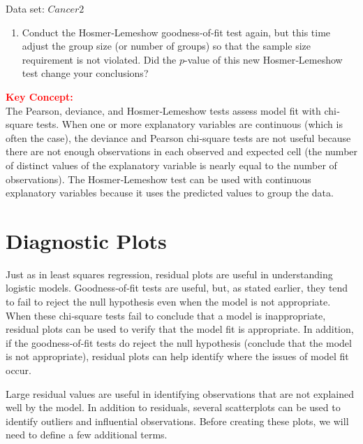 \documentclass[
]{report}
\providecommand{\tightlist}{%
  \setlength{\itemsep}{0pt}\setlength{\parskip}{0pt}}
\begin{document}
Data set: \(Cancer2\)

\begin{enumerate}
\def\labelenumi{\arabic{enumi}.}
\setcounter{enumi}{31}
\tightlist
\item
  Conduct the Hosmer‐Lemeshow goodness‐of‐fit test again, but this time adjust the group size (or number of groups) so that the sample size requirement is not violated. Did the \(p\)-value of this new Hosmer‐Lemeshow test change your conclusions?
\end{enumerate}

\large

\textbf{\textcolor{red}{Key Concept:}}\\
\color{red}
The Pearson, deviance, and Hosmer‐Lemeshow tests assess model fit with chi‐square tests. When one or more explanatory variables are continuous (which is often the case), the deviance and Pearson chi‐square tests are not useful because there are not enough observations in each observed and expected cell (the number of distinct values of the explanatory variable is nearly equal to the number of observations). The Hosmer‐Lemeshow test can be used with continuous explanatory variables because it uses the predicted values to group the data.
\color{black}
\normalsize

\hypertarget{diagnostic-plots-1}{%
\section{\texorpdfstring{\textbf{Diagnostic Plots}}{Diagnostic Plots}}\label{diagnostic-plots-1}}

Just as in least squares regression, residual plots are useful in understanding logistic models. Goodness‐of‐fit tests are useful, but, as stated earlier, they tend to fail to reject the null hypothesis even when the model is not appropriate. When these chi‐square tests fail to conclude that a model is inappropriate, residual plots can be used to verify that the model fit is appropriate. In addition, if the goodness‐of‐fit tests do reject the null hypothesis (conclude that the model is not appropriate), residual plots can help identify where the issues of model fit occur.

Large residual values are useful in identifying observations that are not explained well by the model. In addition to residuals, several scatterplots can be used to identify outliers and influential observations. Before creating these plots, we will need to define a few additional terms.
\end{document}
